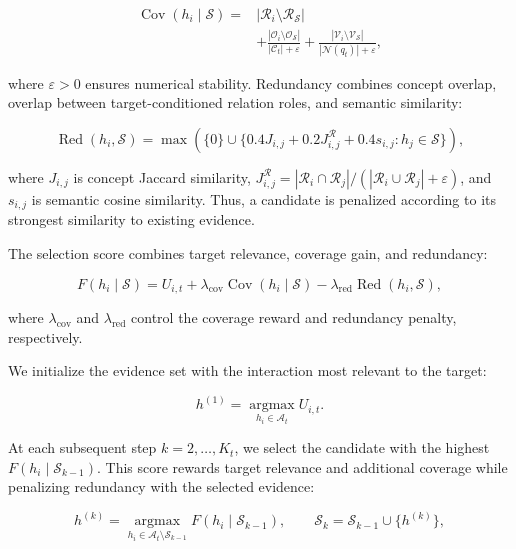 \documentclass{llncs}
\begin{document}
\begin{equation}
\begin{aligned}
\operatorname{Cov}(h_i\mid\mathcal S)
={}&|\mathcal R_i\setminus\mathcal R_{\mathcal S}|\\
&+\frac{|\mathcal O_i\setminus\mathcal O_{\mathcal S}|}{|\mathcal C_t|+\varepsilon}
+\frac{|\mathcal V_i\setminus\mathcal V_{\mathcal S}|}{|\mathcal N(q_t)|+\varepsilon},
\end{aligned}
\end{equation}

where $\varepsilon>0$ ensures numerical stability. Redundancy combines concept overlap, overlap between target-conditioned relation roles, and semantic similarity:

\begin{equation}
\operatorname{Red}(h_i,\mathcal S)
=\max\left(\{0\}\cup
\{0.4J_{i,j}+0.2J^{\mathcal R}_{i,j}+0.4s_{i,j}:h_j\in\mathcal S\}\right),
\end{equation}

where $J_{i,j}$ is concept Jaccard similarity, $J^{\mathcal R}_{i,j}=|\mathcal R_i\cap\mathcal R_j|/(|\mathcal R_i\cup\mathcal R_j|+\varepsilon)$, and $s_{i,j}$ is semantic cosine similarity. Thus, a candidate is penalized according to its strongest similarity to existing evidence.

The selection score combines target relevance, coverage gain, and redundancy:

\begin{equation}
F(h_i\mid\mathcal S)
=
U_{i,t}
+\lambda_{\mathrm{cov}}\operatorname{Cov}(h_i\mid\mathcal S)
-\lambda_{\mathrm{red}}\operatorname{Red}(h_i,\mathcal S),
\end{equation}

where $\lambda_{\mathrm{cov}}$ and $\lambda_{\mathrm{red}}$ control the coverage reward and redundancy penalty, respectively.

We initialize the evidence set with the interaction most relevant to the target:

\begin{equation}
h^{(1)} = \operatorname*{\arg\max}_{h_i\in\mathcal{A}_t} U_{i,t}.
\end{equation}

At each subsequent step \(k=2,\ldots,K_t\), we select the candidate with the highest \(F(h_i\mid\mathcal S_{k-1})\). This score rewards target relevance and additional coverage while penalizing redundancy with the selected evidence:

\begin{equation}
h^{(k)}=\operatorname*{\arg\max}_{h_i\in \mathcal{A}_t\setminus\mathcal{S}_{k-1}} F(h_i\mid\mathcal{S}_{k-1}),
\qquad 
\mathcal{S}_{k}=\mathcal{S}_{k-1}\cup\{h^{(k)}\},
\end{equation}
\end{document}
